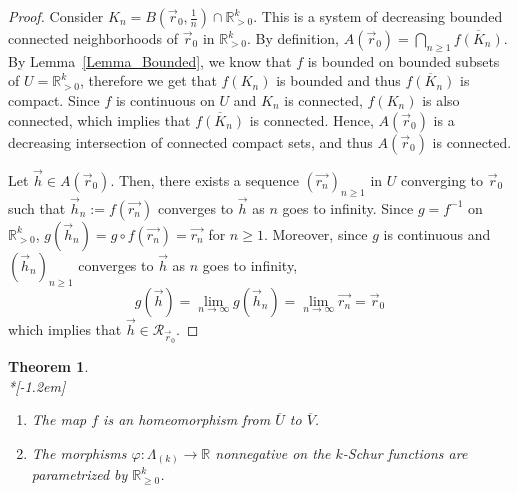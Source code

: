 \documentclass[10pt,a4paper]{amsart}
\newtheorem{theorem}{Theorem}[section]
\theoremstyle{definition}
\begin{document}
\begin{proof}
Consider $K_{n}=B\left( \vec{r}_{0},\frac{1}{n}\right) \cap\mathbb{R}%
_{>0}^{k}$. This is a system of decreasing bounded connected neighborhoods of
$\vec{r}_{0}$ in $\mathbb{R}_{>0}^{k}$. By definition, $A(\vec{r}_{0}%
)=\bigcap_{n\geq1}\overline{f(K_{n})}$. By Lemma~\ref{Lemma_Bounded}, we know
that $f$ is bounded on bounded subsets of $U=\mathbb{R}_{>0}^{k}$, therefore
we get that $f(K_{n})$ is bounded and thus $\overline{f(K_{n})}$ is compact.
Since $f$ is continuous on $U$ and $K_{n}$ is connected, $f(K_{n})$ is also
connected, which implies that $\overline{f(K_{n})}$ is connected. Hence,
$A(\vec{r}_{0})$ is a decreasing intersection of connected compact sets, and
thus $A(\vec{r}_{0})$ is connected.

Let $\vec{h}\in A(\vec{r}_{0})$. Then, there exists a sequence $(\vec
{r_{n}})_{n\geq1}$ in $U$ converging to $\vec{r}_{0}$ such that $\vec{h}%
_{n}:=f(\vec{r_{n}})$ converges to $\vec{h}$ as $n$ goes to infinity. Since $g=f^{-1}$ on $\mathbb{R}_{>0}^{k}$, $g(\vec{h}_{n})=g\circ f(\vec
{r_{n}})=\vec{r_{n}}$ for $n\geq1$. Moreover, since $g$ is continuous and
$(\vec{h}_{n})_{n\geq1}$ converges to $\vec{h}$ as $n$ goes to infinity,
\[
g(\vec{h})=\lim_{n\rightarrow\infty}g(\vec{h}_{n})=\lim_{n\rightarrow\infty
}\vec{r_{n}}=\vec{r}_{0}%
\]
which implies that $\vec{h}\in\mathcal{R}_{\vec{r}_{0}}$.
\end{proof}


\begin{theorem}\label{Th_UVhomeo}\ \\*[-1.2em]

\begin{enumerate}
\item\label{theo5.6_1} The map $f$ is an homeomorphism from $\overline{U}$ to $\overline{V}$.

\item\label{theo5.6_2} The morphisms $\varphi:\Lambda_{(k)}\rightarrow\mathbb{R}$ nonnegative
on the $k$-Schur functions are parametrized by $\mathbb{R}_{\geq0}^{k}$.
\end{enumerate}
\end{theorem}
\end{document}
